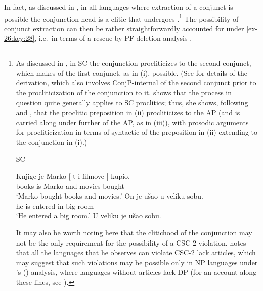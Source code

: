\documentclass[output=paper]{langsci/langscibook}
\begin{document}
In fact, as discussed in \textcite{Odainpress}, in all languages where
extraction of a conjunct is possible the conjunction head is a clitic that
undergoes .\footnote{As discussed in \textcite{Stjepanovic2014}, in
    \gls{SC} the conjunction procliticizes to the second conjunct, which makes
     of the first conjunct, as in (i), possible. (See
    \citealt{Stjepanovic2014} for details of the derivation, which also
    involves ConjP-internal  of the second conjunct prior to the
    procliticization of the conjunction to it. \citeauthor{Stjepanovic2014}
    shows that the process in question quite generally applies to \gls{SC}
    proclitics; thus, she shows, following \citealt{Boskovic2013b} and
    \citealt{Talic2014}, that the proclitic preposition in (ii) procliticizes
    to the AP (and is carried along under further  of the AP, as in
    (iii)), with  prosodic arguments for procliticization in
    terms of syntactic  of the preposition in (ii) extending to the
    conjunction in (i).)

\begin{exe}
 \glsdesc{SC}
    \begin{xlist}
	\ex\gll {}Knjige je Marko [ t i filmove ] kupio.\\
            books is Marko {} {} and movies {} bought\\
	\glt    \enquote*{Marko bought books and movies.}
	\ex\gll On  je  ušao  u  veliku  sobu.\\
			he is entered in big room\\
	\glt \enquote*{He entered a big room.}
	\ex U veliku je ušao sobu.
    \end{xlist}
\end{exe}

It may also be worth noting here that the clitichood of the conjunction may not
be the only requirement for the possibility of a CSC-2 violation.
\citeauthor{Odainpress} notes that all the languages that he observes can
violate CSC-2 lack articles, which may suggest that such violations may be
possible only in NP languages under \citeauthor{Boskovic2008}’s
(\citeyear{Boskovic2008,Boskovic2012}) analysis, where languages without
articles lack DP (for an account along these lines, see
\citealt{Boskovic2017}).\label{fn:24}} The possibility of conjunct extraction
can then be rather straightforwardly accounted for under \eqref{ex-26:key:28}, i.e.\ in terms
of a rescue-by-\gls{PF} deletion analysis
\parencite[see][]{Odainpress,Stjepanovic2014}.
\end{document}
